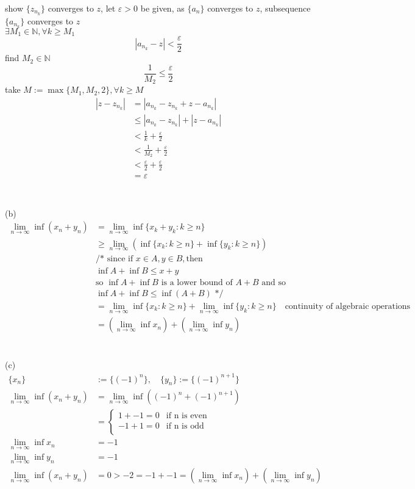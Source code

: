 \documentclass[12pt, border = 4pt, multi]{article} %
\begin{document}
show $\{z_{n_k}\}$ converges to $z$, let $\varepsilon > 0$ be given, as $\{a_n\}$ converges to $z$, subsequence $\{a_{n_k}\}$ converges to $z$\\
$\exists M_1 \in \mathbb{N}, \forall k \geq M_1$
\[|a_{n_k} - z| < \frac{\varepsilon}{2}\]
find $M_2 \in \mathbb{N}$
\[\frac{1}{M_2} \leq \frac{\varepsilon}{2}\]
take $M := \max\{M_1, M_2, 2\}, \forall k \geq M$
\begin{align*}
|z - z_{n_k}| &= |a_{n_k} - z_{n_k} + z - a_{n_k}|\\
&\leq |a_{n_k} - z_{n_k}| + |z - a_{n_k}|\\
&< \frac{1}{k} + \frac{\varepsilon}{2}\\
&< \frac{1}{M_2} + \frac{\varepsilon}{2}\\
&< \frac{\varepsilon}{2} + \frac{\varepsilon}{2}\\
&= \varepsilon\\
\end{align*}
\\
\\
(b)
\begin{align*}
\lim_{n \rightarrow \infty} \inf (x_n + y_n) &= \lim_{n \rightarrow \infty} \inf\{x_k + y_k: k \geq n\}\\
&\geq \lim_{n \rightarrow \infty} (\inf\{x_k: k \geq n\} + \inf\{y_k: k \geq n\})\\
&\text{/* since if } x \in A, y \in B, \text{then}\\
&\inf A + \inf B \leq x + y\\
&\text{so } \inf A + \inf B \text{ is a lower bound of } A + B \text{ and so}\\
&\inf A + \inf B \leq \inf(A + B) \text{ */}\\
&= \lim_{n \rightarrow \infty} \inf\{x_k: k \geq n\} + \lim_{n \rightarrow \infty} \inf\{y_k: k \geq n\}\quad\text{continuity of algebraic operations}\\
&= \left(\lim_{n \rightarrow \infty} \inf x_n \right) + \left(\lim_{n \rightarrow \infty} \inf y_n \right)
\end{align*}
\\
\\
(c)
\begin{align*}
\{x_n\} &:= \{(-1) ^ n\},\quad\{y_n\} := \{(-1) ^ {n + 1}\}\\
\lim_{n \rightarrow \infty}\inf(x_n + y_n) &= \lim_{n \rightarrow \infty}\inf((-1) ^ n + (-1) ^ {n + 1})\\
&=
\begin{cases}
1 + -1 = 0 & \text{if n is even}\\
-1 + 1 = 0 & \text{if n is odd}\\
\end{cases}\\
\lim_{n \rightarrow \infty}\inf x_n &= -1\\
\lim_{n \rightarrow \infty}\inf y_n &= -1\\
\lim_{n \rightarrow \infty}\inf(x_n + y_n) &= 0 > -2 = -1 + -1 = \left(\lim_{n \rightarrow \infty} \inf x_n \right) + \left(\lim_{n \rightarrow \infty} \inf y_n \right)
\end{align*}
\end{document}
